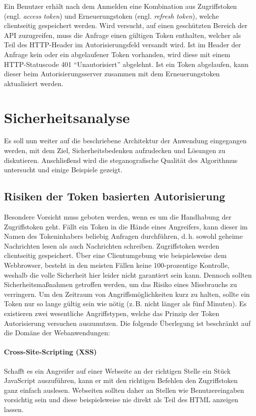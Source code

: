 

\noindent
Ein Benutzer erhält nach dem Anmelden eine Kombination aus Zugriffstoken
(engl. \textit{access token}) und Erneuerungstoken (engl. \textit{refresh token}),
welche clientseitig gespeichert werden.
Wird versucht, auf einen geschützten Bereich der API zuzugreifen, muss die Anfrage
einen gültigen Token enthalten, welcher als Teil des HTTP-Header im
Autorisierungsfeld versandt wird.
Ist im Header der Anfrage kein oder ein
abgelaufener Token vorhanden, wird diese mit einem HTTP-Statuscode 401 \enquote{Unautorisiert}
abgelehnt. Ist ein Token abgelaufen, kann dieser beim Autorisierungsserver
zusammen mit dem Erneuerungstoken aktualisiert werden.

\section{Sicherheitsanalyse}
Es soll nun weiter auf die beschriebene Architektur der Anwendung eingegangen werden,
mit dem Ziel, Sicherheitsbedenken aufzudecken und Lösungen zu diskutieren.
Anschließend wird die steganografische Qualität des Algorithmus
untersucht und einige Beispiele gezeigt.

\subsection{Risiken der Token basierten Autorisierung}
Besondere Vorsicht muss geboten werden, wenn es um die Handhabung
der Zugriffstoken geht.
Fällt ein Token in die Hände eines Angreifers, kann dieser
im Namen des Tokeninhabers beliebig Anfragen durchführen, d.\,h. sowohl geheime Nachrichten
lesen als auch Nachrichten schreiben.
Zugriffstoken werden clientseitig gespeichert. Über eine
Clientumgebung wie beispielsweise dem Webbrowser, besteht in den meisten
Fällen keine 100-prozentige Kontrolle, weshalb die volle Sicherheit hier leider nicht
garantiert sein kann. Dennoch sollten Sicherheitsmaßnahmen getroffen werden, um
das Risiko eines Missbrauchs zu verringern.
Um den Zeitraum von Angriffsmöglichkeiten kurz zu halten, sollte
ein Token nur so lange gültig sein wie nötig
(z.\,B. nicht länger als fünf Minuten).
Es existieren zwei wesentliche Angriffstypen, welche das Prinzip der Token Autorisierung
versuchen auszunutzen. Die folgende Überlegung ist beschränkt auf die Domäne
der Webanwendungen:

\paragraph{Cross-Site-Scripting (XSS)}
Schafft es ein Angreifer auf einer Webseite an der richtigen Stelle
ein Stück JavaScript auszuführen,
kann er mit den richtigen Befehlen den Zugriffstoken ganz einfach auslesen.
Webseiten sollten daher an Stellen wie Benutzereingaben vorsichtig sein und diese
beispielsweise nie direkt als Teil des HTML anzeigen lassen.

